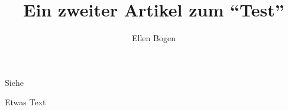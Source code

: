 \documentclass{dtk2}
\author{Ellen Bogen}
\begin{document}
\title{Ein zweiter Artikel zum "`Test"'}

\maketitle

Siehe~\cite{lamport:handbuch}

Etwas Text \clearpage


\end{document}
